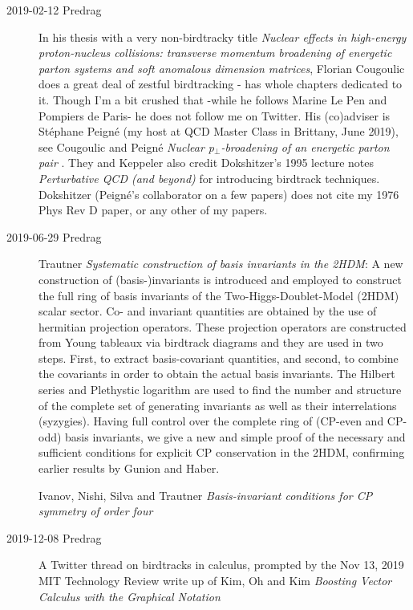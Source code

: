 \begin{description}
\item[2019-02-12 Predrag]
In his thesis with  a very non-birdtracky title {\em Nuclear
effects in high-energy proton-nucleus collisions: transverse momentum broadening
of energetic parton systems and soft anomalous dimension matrices},
 {Florian Cougoulic} does a great
deal of zestful birdtracking - has whole chapters dedicated to it.
Though I'm a bit crushed that -while he follows Marine Le Pen and
Pompiers de Paris- he does not follow me on
 {Twitter}. His (co)adviser is
{St{\'e}phane Peign{\'e}} (my host at QCD Master
Class in Brittany, June 2019), see
Cougoulic and Peign{\'{e}}
{\em Nuclear p$_\bot$-broadening of an energetic parton pair}
.
They and Keppeler also credit Dokshitzer's 1995 lecture notes
{\it Perturbative QCD (and beyond)} for introducing birdtrack techniques.
Dokshitzer (Peign{\'e}'s collaborator on a few papers) does not cite my 1976
Phys Rev D paper, or any other of my papers.

\item[2019-06-29 Predrag]
Trautner
{\em Systematic construction of basis invariants in the {2HDM}}:
A new construction of (basis-)invariants is introduced and
employed to construct the full ring of basis invariants of the
Two-Higgs-Doublet-Model (2HDM) scalar sector. Co- and invariant
quantities are obtained by the use of hermitian projection operators.
These projection operators are constructed from Young tableaux via
birdtrack diagrams and they are used in two steps. First, to extract
basis-covariant quantities, and second, to combine the covariants in
order to obtain the actual basis invariants. The Hilbert series and
Plethystic logarithm are used to find the number and structure of the
complete set of generating invariants as well as their interrelations
(syzygies). Having full control over the complete ring of (CP-even and
CP-odd) basis invariants, we give a new and simple proof of the necessary
and sufficient conditions for explicit CP conservation in the 2HDM,
confirming earlier results by Gunion and Haber.

Ivanov, Nishi, Silva and Trautner
{\em Basis-invariant conditions for {CP} symmetry of order four}

\item[2019-12-08 Predrag]
A 
{Twitter thread} on birdtracks in calculus, prompted by
the Nov 13, 2019 MIT Technology Review
{write up} of Kim, Oh and Kim
{\em Boosting Vector Calculus with the Graphical Notation} 


\end{description}
